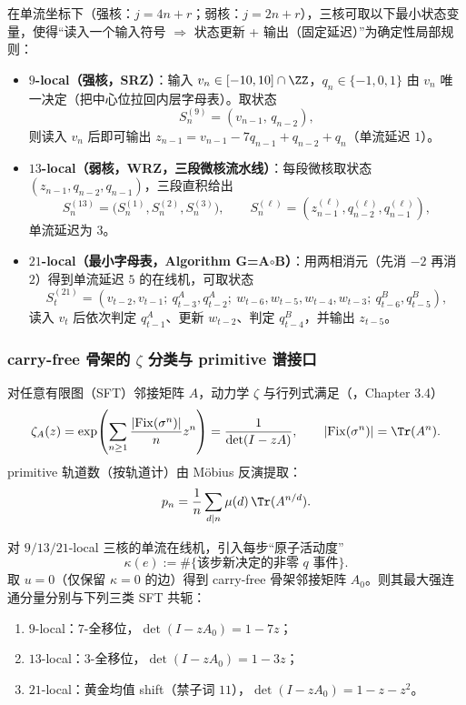 \begin{proposition}\label{prop:min-state-spec-flow}
在单流坐标下（强核：$j=4n+r$；弱核：$j=2n+r$），三核可取以下最小状态变量，使得“读入一个输入符号 $\Rightarrow$ 状态更新 + 输出（固定延迟）”为确定性局部规则：
\begin{itemize}
  \item \textbf{$9$-local（强核，SRZ）}：输入 $v_n\in[-10,10]\cap\ZZ$，$q_n\in\{-1,0,1\}$ 由 $v_n$ 唯一决定（把中心位拉回内层字母表）。取状态
  \[
  S^{(9)}_n=(v_{n-1},\,q_{n-2}),
  \]
  则读入 $v_n$ 后即可输出 $z_{n-1}=v_{n-1}-7q_{n-1}+q_{n-2}+q_n$（单流延迟 $1$）。
  \item \textbf{$13$-local（弱核，WRZ，三段微核流水线）}：每段微核取状态
  \(
  (z_{n-1},q_{n-2},q_{n-1})
  \)，三段直积给出
  \[
  S^{(13)}_n=\bigl(S^{(1)}_n,S^{(2)}_n,S^{(3)}_n\bigr),
  \qquad S^{(\ell)}_n=(z^{(\ell)}_{n-1},q^{(\ell)}_{n-2},q^{(\ell)}_{n-1}),
  \]
  单流延迟为 $3$。
  \item \textbf{$21$-local（最小字母表，Algorithm G=A$\circ$B）}：用两相消元（先消 $-2$ 再消 $2$）得到单流延迟 $5$ 的在线机，可取状态
  \[
  S^{(21)}_t=(v_{t-2},v_{t-1};\ q^A_{t-3},q^A_{t-2};\ w_{t-6},w_{t-5},w_{t-4},w_{t-3};\ q^B_{t-6},q^B_{t-5}),
  \]
  读入 $v_t$ 后依次判定 $q^A_{t-1}$、更新 $w_{t-2}$、判定 $q^B_{t-4}$，并输出 $z_{t-5}$。
\end{itemize}
\end{proposition}

\subsubsection{carry-free 骨架的 \texorpdfstring{$\zeta$}{zeta} 分类与 primitive 谱接口}
对任意有限图（SFT）邻接矩阵 $A$，动力学 $\zeta$ 与行列式满足（\cite{BrinStuck2002}，Chapter 3.4）
\[
\zeta_A(z)=\exp\!\left(\sum_{n\ge 1}\frac{|\mathrm{Fix}(\sigma^n)|}{n}z^n\right)=\frac{1}{\det(I-zA)},
\qquad
|\mathrm{Fix}(\sigma^n)|=\Tr(A^n).
\]
primitive 轨道数（按轨道计）由 Möbius 反演提取：
\[
p_n=\frac{1}{n}\sum_{d\mid n}\mu(d)\,\Tr(A^{n/d}).
\]

\begin{theorem}\label{thm:carry-free-zeta-trichotomy}
对 $9/13/21$-local 三核的单流在线机，引入每步“原子活动度”
\[
\kappa(e):=\#\{\text{该步新决定的非零 }q\text{ 事件}\}.
\]
取 $u=0$（仅保留 $\kappa=0$ 的边）得到 carry-free 骨架邻接矩阵 $A_0$。则其最大强连通分量分别与下列三类 SFT 共轭：
\begin{enumerate}
  \item $9$-local：$7$-全移位，$\det(I-zA_0)=1-7z$；
  \item $13$-local：$3$-全移位，$\det(I-zA_0)=1-3z$；
  \item $21$-local：黄金均值 shift（禁子词 $11$），$\det(I-zA_0)=1-z-z^2$。
\end{enumerate}
\end{theorem}

